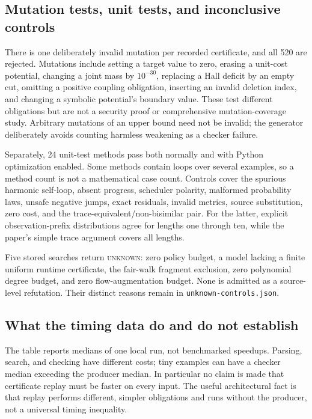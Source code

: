 \documentclass[11pt,letterpaper]{article}
\theoremstyle{definition}\newtheorem{definition}[theorem]{Definition}
\theoremstyle{remark}\newtheorem{remark}[theorem]{Remark}
\newcommand{\code}[1]{\texttt{#1}}
\newcommand{\unknown}{\textsc{unknown}}
\begin{document}
\subsection{Mutation tests, unit tests, and inconclusive controls}
There is one deliberately invalid mutation per recorded certificate, and all 520 are rejected. Mutations include setting a target value to zero, erasing a unit-cost potential, changing a joint mass by $10^{-30}$, replacing a Hall deficit by an empty cut, omitting a positive coupling obligation, inserting an invalid deletion index, and changing a symbolic potential's boundary value. These test different obligations but are not a security proof or comprehensive mutation-coverage study. Arbitrary mutations of an upper bound need not be invalid; the generator deliberately avoids counting harmless weakening as a checker failure.

Separately, 24 unit-test methods pass both normally and with Python optimization enabled. Some methods contain loops over several examples, so a method count is not a mathematical case count. Controls cover the spurious harmonic self-loop, absent progress, scheduler polarity, malformed probability laws, unsafe negative jumps, exact residuals, invalid metrics, source substitution, zero cost, and the trace-equivalent/non-bisimilar pair. For the latter, explicit observation-prefix distributions agree for lengths one through ten, while the paper's simple trace argument covers all lengths.

Five stored searches return \unknown: zero policy budget, a model lacking a finite uniform runtime certificate, the fair-walk fragment exclusion, zero polynomial degree budget, and zero flow-augmentation budget. None is admitted as a source-level refutation. Their distinct reasons remain in \code{unknown-controls.json}.

\subsection{What the timing data do and do not establish}

The table reports medians of one local run, not benchmarked speedups. Parsing, search, and checking have different costs; tiny examples can have a checker median exceeding the producer median. In particular no claim is made that certificate replay must be faster on every input. The useful architectural fact is that replay performs different, simpler obligations and runs without the producer, not a universal timing inequality.
\end{document}
